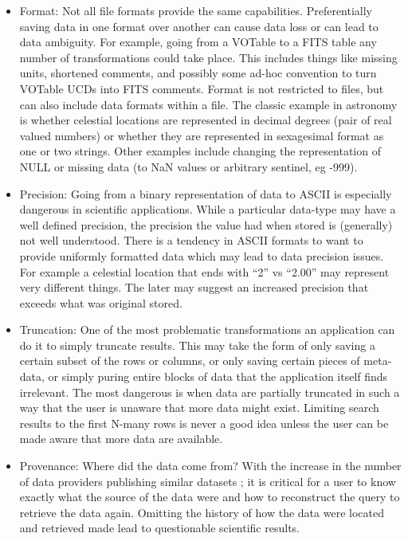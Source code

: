 \begin{itemize}

\item Format:  Not all file formats provide the same capabilities.  
  Preferentially saving data in one format over another can cause 
  data loss or can lead to data ambiguity.  For example, going from
  a VOTable to a FITS table any number of transformations could take place.
  This includes things like missing units, shortened comments, 
  and possibly some ad-hoc convention to turn VOTable UCDs into
  FITS comments.
  Format is not restricted to files, but can also include data formats within a file.  The classic example in astronomy is whether celestial
  locations are represented in decimal degrees (pair of real valued numbers)
  or  whether they are represented in sexagesimal format as one or two strings.
  Other examples include changing the representation of NULL or missing
  data (to NaN values or arbitrary sentinel, eg -999).


\item Precision:  Going from a binary representation of data to ASCII is 
  especially dangerous in scientific applications.   While a particular
data-type may have a well defined precision, the precision the 
value had when stored is (generally) not well understood. There is a
tendency in ASCII formats to want to provide uniformly formatted data which may
lead to data precision issues.  For example a celestial location that ends with ``2'' vs ``2.00'' may represent very different things.  The later may suggest
an increased precision that exceeds what was original stored.


\item Truncation:  One of the most problematic transformations an application
can do it to simply truncate results.  This may take the form of only saving 
a certain subset of the rows or columns, or only saving certain pieces
of meta-data, or simply puring entire blocks of data that the
application itself finds irrelevant.  The most dangerous is when 
data are partially truncated in such a way that the user is unaware that
more data might exist.  Limiting search results to the first N-many
rows is never a good idea unless the user can be made aware that 
more data are available.


\item Provenance: Where did the data come from? With the increase in the number
of data providers publishing similar datasets ; it is critical for a user
to know exactly what the source of the data were and how to reconstruct
the query to retrieve the data again.  Omitting the history of how the 
data were located and retrieved made lead to questionable scientific
results.

\end{itemize}


